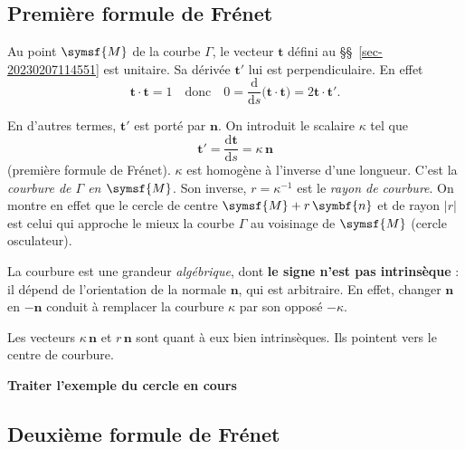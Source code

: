\documentclass[
  a4paper,
  DIV=11,
  numbers=noendperiod]{scrreprt}
\newcommand{\D}{{\mathrm d}}
\newcommand{\point}[1]{\symsf{#1}}
\renewcommand{\vec}[1]{\symbf{#1}}
\begin{document}
\hypertarget{premiuxe8re-formule-de-fruxe9net}{%
\subsection{Première formule de
Frénet}\label{premiuxe8re-formule-de-fruxe9net}}

Au point \(\point{M}\) de la courbe \(\Gamma\), le vecteur \(\vec{t}\)
défini au §§~\ref{sec-20230207114551} est unitaire. Sa dérivée
\(\vec{t}'\) lui est perpendiculaire. En effet \[
\vec t \cdot \vec t = 1 \quad \text{donc} \quad 0 = \frac{\D}{\D s} \bigl( \vec t \cdot \vec t \bigr) = 2 \vec t \cdot \vec t'.
\]

En d'autres termes, \(\vec t'\) est porté par \(\vec n\). On introduit
le scalaire \(\kappa\) tel que \[
\vec t' = \frac{\D \vec{t}}{\D s} = \kappa \, \vec n
\] (première formule de Frénet). \(\kappa\) est homogène à l'inverse
d'une longueur. C'est la \emph{courbure de \(\Gamma\) en \(\point{M}\)}.
Son inverse, \(r = \kappa^{-1}\) est le \emph{rayon de courbure}. On
montre en effet que le cercle de centre \(\point{M} + r \, \vec{n}\) et
de rayon \(\lvert r \rvert\) est celui qui approche le mieux la courbe
\(\Gamma\) au voisinage de \(\point{M}\) (cercle osculateur).

\begin{tcolorbox}[enhanced jigsaw, toptitle=1mm, title=\textcolor{quarto-callout-note-color}{\faInfo}\hspace{0.5em}{Note}, colbacktitle=quarto-callout-note-color!10!white, toprule=.15mm, left=2mm, bottomrule=.15mm, arc=.35mm, breakable, opacityback=0, colframe=quarto-callout-note-color-frame, bottomtitle=1mm, titlerule=0mm, leftrule=.75mm, opacitybacktitle=0.6, coltitle=black, rightrule=.15mm, colback=white]

La courbure est une grandeur \emph{algébrique}, dont \textbf{le signe
n'est pas intrinsèque} : il dépend de l'orientation de la normale
\(\vec n\), qui est arbitraire. En effet, changer \(\vec n\) en
\(-\vec n\) conduit à remplacer la courbure \(\kappa\) par son opposé
\(-\kappa\).

Les vecteurs \(\kappa \, \vec n\) et \(r \, \vec n\) sont quant à eux
bien intrinsèques. Ils pointent vers le centre de courbure.

\textbf{Traiter l'exemple du cercle en cours}

\end{tcolorbox}

\hypertarget{deuxiuxe8me-formule-de-fruxe9net}{%
\subsection{Deuxième formule de
Frénet}\label{deuxiuxe8me-formule-de-fruxe9net}}
\end{document}
